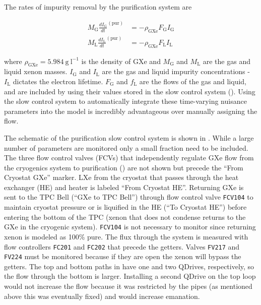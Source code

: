 The rates of impurity removal by the purification system are

\vspace{-20pt}

\begin{subequations}
\begin{align}
M_{\mathrm{G}} \frac{dI_{\mathrm{G}}}{dt}^{(\mathrm{pur})} &= -\rho_{\mathrm{GXe}} F_{\mathrm{G}} I_{\mathrm{G}}
\label{eq:electron_lifetime_model_removal_gxe}
\\
M_{\mathrm{L}} \frac{dI_{\mathrm{L}}}{dt}^{(\mathrm{pur})} &= -\rho_{\mathrm{GXe}} F_{\mathrm{L}} I_{\mathrm{L}}
\label{eq:electron_lifetime_model_removal_lxe}
\end{align}
\end{subequations}

\noindent where $\rho_{\mathrm{GXe}} = 5.984\ \mathrm{g\ l^{-1}}$ is the density of GXe and $M_{\mathrm{G}}$ and $M_{\mathrm{L}}$ are the
gas and liquid xenon masses.  $I_{\mathrm{G}}$ and $I_{\mathrm{L}}$ are the gas and liquid impurity concentrations - $I_{\mathrm{L}}$
dictates the electron lifetime.  $F_{\mathrm{G}}$ and $f_{\mathrm{L}}$ are the
flows of the gas and liquid, and are included by using their values stored in the slow control system
().  Using the slow control system to automatically integrate these time-varying nuisance
parameters into the model is incredibly advantageous over manually assigning the flow.

The schematic of the purification slow control system is shown in .  While a large
number of parameters are monitored only a small fraction need to be included.  The three flow control valves (FCVs) that independently
regulate GXe flow from the cryogenics system to purification () are not shown but precede the
``From Cryostat GXe'' marker.  LXe from the cryostat that passes
through the heat exchanger (HE) and heater is labeled ``From Cryostat HE''.  Returning GXe is sent to the TPC Bell (``GXe to TPC Bell'')
through flow control valve \texttt{FCV104} to maintain cryostat pressure or is liquified in the HE (``To
Cryostat HE'') before entering the bottom of the TPC (xenon that does not
condense returns to the GXe in the cryogenic system).  \texttt{FCV104} is not necessary to monitor since returning xenon is modeled
as 100\% pure.  The flux through the system is
measured with flow controllers \texttt{FC201} and \texttt{FC202} that precede the getters.  Valves
\texttt{FV217} and \texttt{FV224} must be monitored because if they are open the xenon will bypass the getters.  The top and bottom
paths in  have one
and two QDrives, respectively, so the flow through the bottom is larger.  Installing a second QDrive on the top loop would not
increase the flow because it was restricted by the pipes (as mentioned above this was eventually fixed) and would increase 
emanation.


